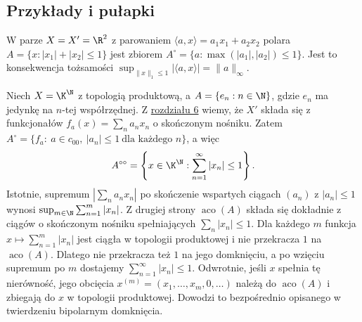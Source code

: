 \subsection{Przykłady i pułapki}

\begin{przyklad}\label{ex:polar-balls}
W parze $X=X'=\R^2$ z parowaniem
$\langle a,x\rangle=a_1x_1+a_2x_2$ polara
$A=\{x:|x_1|+|x_2|\le1\}$ jest zbiorem
$A^\circ=\{a:\max(|a_1|,|a_2|)\le1\}$.
Jest to konsekwencja tożsamości
$\sup_{\|x\|_1\le1}|\langle a,x\rangle|=\|a\|_\infty$.
\begin{center}
\end{center}
\end{przyklad}

\begin{przyklad}\label{ex:polar-product}
Niech $X=\K^\N$ z topologią produktową, a
$A=\{e_n:n\in\N\}$, gdzie $e_n$ ma jedynkę na
$n$-tej współrzędnej. Z \hyperref[sec:hahn-banach]{rozdziału 6} wiemy, że $X'$
składa się z funkcjonałów $f_a(x)=\sum_n a_nx_n$
o skończonym nośniku. Zatem
$A^\circ=\{f_a:\ a\in c_{00},\ |a_n|\le1\ \text{dla każdego }n\}$,
a więc
\[
 A^{\circ\circ}=
 \left\{x\in\K^\N:\sum_{n=1}^\infty|x_n|\le1\right\}.
\]
Istotnie, supremum $|\sum_n a_nx_n|$ po
skończenie wspartych ciągach $(a_n)$ z $|a_n|\le1$
wynosi $\sup_{m\in\N}\sum_{n=1}^m|x_n|$. Z drugiej strony $\operatorname{aco}(A)$ składa się dokładnie
z ciągów o skończonym nośniku spełniających
$\sum_n|x_n|\le1$. Dla każdego $m$ funkcja
$x\mapsto\sum_{n=1}^m|x_n|$ jest ciągła w topologii
produktowej i nie przekracza $1$ na $\operatorname{aco}(A)$.
Dlatego nie przekracza też $1$ na jego domknięciu,
a po wzięciu supremum po $m$ dostajemy
$\sum_{n=1}^\infty|x_n|\le1$. Odwrotnie, jeśli
$x$ spełnia tę nierówność, jego obcięcia
$x^{(m)}=(x_1,\ldots,x_m,0,\ldots)$ należą do
$\operatorname{aco}(A)$ i zbiegają do $x$ w topologii
produktowej. Dowodzi to bezpośrednio opisanego
w twierdzeniu bipolarnym domknięcia.
\end{przyklad}

